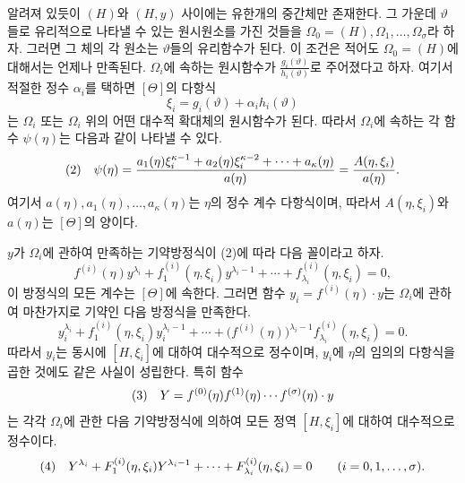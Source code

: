 알려져 있듯이 $(H)$와 $(H,y)$ 사이에는 유한개의 중간체만 존재한다. 그 가운데 $\vartheta$들로 유리적으로 나타낼 수 있는 원시원소를 가진 것들을 $\Omega_0=(H),\Omega_1,\ldots,\Omega_\sigma$라 하자. 그러면 그 체의 각 원소는 $\vartheta$들의 유리함수가 된다. 이 조건은 적어도 $\Omega_0=(H)$에 대해서는 언제나 만족된다. $\Omega_i$에 속하는 원시함수가
$\frac{g_i(\vartheta)}{h_i(\vartheta)}$로 주어졌다고 하자. 여기서 적절한 정수 $\alpha_i$를 택하면 $[\Theta]$의 다항식
\[
 \xi_i=g_i(\vartheta)+\alpha_i h_i(\vartheta)
\]
는 $\Omega_i$ 또는 $\Omega_i$ 위의 어떤 대수적 확대체의 원시함수가 된다. 따라서 $\Omega_i$에 속하는 각 함수 $\psi(\eta)$는 다음과 같이 나타낼 수 있다.
\[
\begin{array}{@{}l@{\quad}l@{}}
(2)& \displaystyle \psi(\eta)=
\frac{a_1(\eta)\xi_i^{\kappa-1}+a_2(\eta)\xi_i^{\kappa-2}+\cdots+a_\kappa(\eta)}
     {a(\eta)}
=\frac{A(\eta,\xi_i)}{a(\eta)}.
\end{array}
\]
여기서 $a(\eta),a_1(\eta),\ldots,a_\kappa(\eta)$는 $\eta$의 정수 계수 다항식이며, 따라서 $A(\eta,\xi_i)$와 $a(\eta)$는 $[\Theta]$의 양이다.

$y$가 $\Omega_i$에 관하여 만족하는 기약방정식이 (2)에 따라 다음 꼴이라고 하자.
\[
 f^{(i)}(\eta)y^{\lambda_i}+f_1^{(i)}(\eta,\xi_i)y^{\lambda_i-1}
+\cdots+f_{\lambda_i}^{(i)}(\eta,\xi_i)=0,
\]
이 방정식의 모든 계수는 $[\Theta]$에 속한다. 그러면 함수 $y_i=f^{(i)}(\eta)\cdot y$는 $\Omega_i$에 관하여 마찬가지로 기약인 다음 방정식을 만족한다.
\[
 y_i^{\lambda_i}+f_1^{(i)}(\eta,\xi_i)y_i^{\lambda_i-1}
+\cdots+\bigl(f^{(i)}(\eta)\bigr)^{\lambda_i-1}
 f_{\lambda_i}^{(i)}(\eta,\xi_i)=0.
\]
따라서 $y_i$는 동시에 $[H,\xi_i]$에 대하여 대수적으로 정수이며, $y_i$에 $\eta$의 임의의 다항식을 곱한 것에도 같은 사실이 성립한다. 특히 함수
\[
\begin{array}{@{}l@{\quad}l@{}}
(3)& \displaystyle Y=f^{(0)}(\eta)f^{(1)}(\eta)\cdots f^{(\sigma)}(\eta)\cdot y
\end{array}
\]
는 각각 $\Omega_i$에 관한 다음 기약방정식에 의하여 모든 정역 $[H,\xi_i]$에 대하여 대수적으로 정수이다.
\[
\begin{array}{@{}l@{\quad}l@{}}
(4)& \displaystyle Y^{\lambda_i}+F_1^{(i)}(\eta,\xi_i)Y^{\lambda_i-1}
+\cdots+F_{\lambda_i}^{(i)}(\eta,\xi_i)=0
\qquad (i=0,1,\ldots,\sigma).
\end{array}
\]

